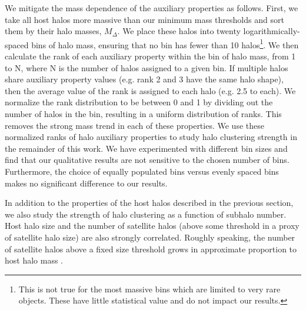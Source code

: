\documentclass[usenatbib,fleqn]{mnras}
\begin{document}
We mitigate the mass dependence of the auxiliary properties as follows. First, 
we take all host halos more massive than our minimum mass thresholds and sort them by 
their halo masses, $M_{\Delta}$. We place these halos into twenty logarithmically-spaced bins 
of halo mass, ensuring that no bin has fewer than 10 halos\footnote{This is not true for the most massive bins which are limited to very rare objects. These have little statistical value and do not impact our results.}. 
We then calculate the rank of each auxiliary property within the bin of halo mass, from 1 to N, where N is the number of halos assigned to a given bin. If multiple halos share auxiliary property values (e.g. rank 2 and 3 have the same halo shape), then the average value of the rank is assigned to each halo (e.g. 2.5 to each). We normalize the rank distribution to be between 0 and 1 by dividing out the number of halos in the bin, resulting in a uniform distribution of ranks. This removes the strong mass trend in each of these properties. We use these normalized ranks of halo auxiliary properties to study halo clustering strength in the remainder of this work. We have experimented with different bin sizes and find that our qualitative results are not sensitive to the chosen number of bins. Furthermore, the choice of equally populated bins versus evenly spaced bins makes no significant difference to our results.

In addition to the properties of the host halos described in the previous section, we also study the strength of halo clustering as a function of subhalo number. Host halo size and the number of satellite halos (above some threshold in a proxy of satellite halo size) 
are also strongly correlated. Roughly speaking, the number of satellite halos above a fixed size threshold grows in approximate proportion to host halo mass \citep{kravtsov_etal04, zentner_etal05}.
\end{document}
